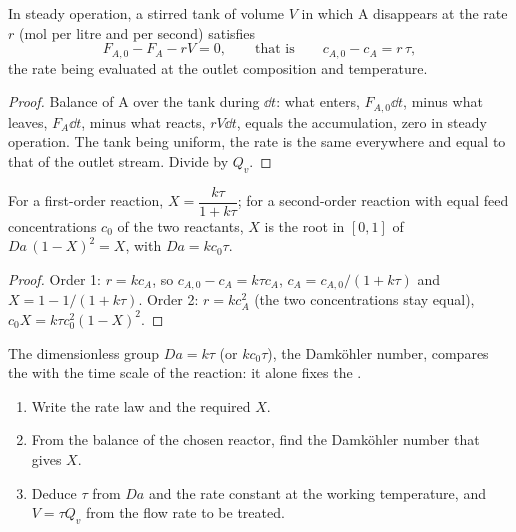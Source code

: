 \begin{proposition}\label{prop:b2:continuous-reactors:cstr-balance}
In steady operation, a stirred tank of volume $V$ in which A disappears at
the rate $r$ (mol per litre and per second) satisfies
\[
  F_{A,0} - F_A - rV = 0, \qquad\text{that is}\qquad c_{A,0} - c_A = r\,\tau ,
\]
the rate being evaluated at the outlet composition and temperature.
\end{proposition}

\begin{proof}
Balance of A over the tank during $\dd t$: what enters, $F_{A,0}\dd t$,
minus what leaves, $F_A\dd t$, minus what reacts, $rV\dd t$, equals the
accumulation, zero in steady operation. The tank being uniform, the rate is
the same everywhere and equal to that of the outlet stream. Divide by $Q_v$.
\end{proof}

\begin{theorem}\label{thm:b2:continuous-reactors:cstr}
For a first-order reaction, $X = \dfrac{k\tau}{1 + k\tau}$; for a
second-order reaction with equal feed concentrations $c_0$ of the two
reactants, $X$ is the root in $[0, 1]$ of $Da\,(1 - X)^2 = X$, with $Da =
kc_0\tau$.
\end{theorem}

\begin{proof}
Order 1: $r = kc_A$, so $c_{A,0} - c_A = k\tau c_A$, $c_A = c_{A,0}/(1 + k\tau)$
and $X = 1 - 1/(1 + k\tau)$. Order 2: $r = kc_A^2$ (the two concentrations stay
equal), $c_0X = k\tau c_0^2(1 - X)^2$.
\end{proof}

The dimensionless group $Da = k\tau$ (or $kc_0\tau$), the Damköhler
number, compares the  with the time scale of the reaction:
it alone fixes the .

\begin{method}\label{met:b2:continuous-reactors:size-reactor}
\begin{enumerate}
  \item Write the rate law and the required  $X$.
  \item From the balance of the chosen reactor, find the Damköhler number
        that gives $X$.
  \item Deduce $\tau$ from $Da$ and the rate constant at the working
        temperature, and $V = \tau Q_v$ from the flow rate to be treated.
\end{enumerate}
\end{method}

